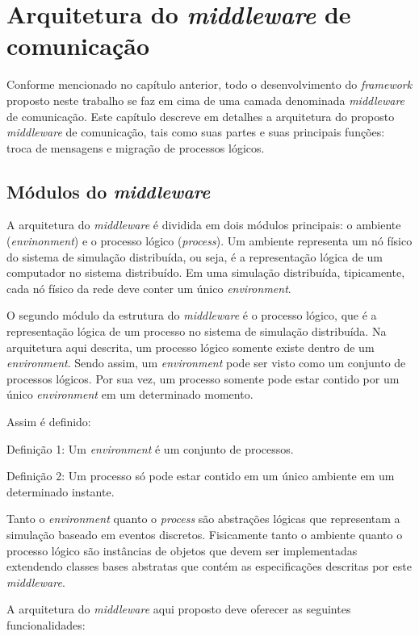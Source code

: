 \chapter{Arquitetura do \textit{middleware} de comunicação \label{chapter_middleware}}

Conforme mencionado no capítulo anterior, todo o desenvolvimento do \textit{framework} proposto neste trabalho se faz em cima de uma camada denominada \textit{middleware} de comunicação. Este capítulo descreve em detalhes a arquitetura do proposto \textit{middleware} de comunicação, tais como suas partes e suas principais funções: troca de mensagens e migração de processos lógicos. 

\section{Módulos do \textit{middleware}}

A arquitetura do \textit{middleware} é dividida em dois módulos principais: o ambiente (\textit{envinonment}) e o processo lógico (\textit{process}). Um ambiente representa um nó físico do sistema de simulação distribuída, ou seja, é a representação lógica de um computador no sistema distribuído. Em uma simulação distribuída, tipicamente, cada nó físico da rede deve conter um único \textit{environment}.

O segundo módulo da estrutura do \textit{middleware} é o processo lógico, que é a representação lógica de um processo no sistema de simulação distribuída. Na arquitetura aqui descrita, um processo lógico somente existe dentro de um \textit{environment}. Sendo assim, um \textit{environment} pode ser visto como um conjunto de processos lógicos. Por sua vez, um processo somente pode estar contido por um único \textit{environment} em um determinado momento.

Assim é definido:

Definição 1: Um \textit{environment} é um conjunto de processos.

Definição 2: Um processo só pode estar contido em um único ambiente em um determinado instante.

Tanto o \textit{environment} quanto o \textit{process} são abstrações lógicas que representam a simulação baseado em eventos discretos. Fisicamente tanto o ambiente quanto o processo lógico são instâncias de objetos que devem ser implementadas extendendo classes bases abstratas que contém as especificações descritas por este \textit{middleware}.

A arquitetura do \textit{middleware} aqui proposto deve oferecer as seguintes funcionalidades:
 
